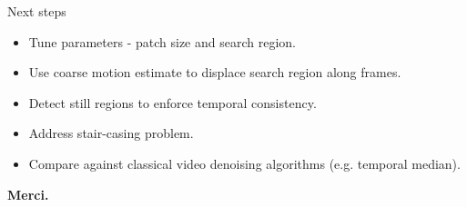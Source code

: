 \documentclass[mathserif]{beamer}
\makeatletter
\newcounter{multipleslide}
\newcommand{\restoreframe}{%
\patchcmd{\beamer@@tmpl@footline}%
	{\themultipleslide}%
	{\insertframenumber}%
	{}%
	{}%
\setcounter{framenumber}{\value{multipleslide}}%
}
\makeatother
\begin{document}
% 
% 
% 

\begin{frame}{Next steps}
	\begin{itemize}\itemsep=1cm
	  \item Tune parameters - patch size and search region.
	  \item Use coarse motion estimate to displace search region along frames.
	  \item Detect still regions to enforce temporal consistency. 
	  \item Address stair-casing problem.
	  \item Compare against classical video denoising algorithms (e.g. temporal median).
  \end{itemize}
\end{frame}


\begin{frame}{}
	\centering
   \vspace{1.7cm}
   \textcolor{MyOrange}{\textbf{\Huge{Merci.}}}\\
   \vspace{5cm}
\end{frame}



% 
% 
\end{document}
